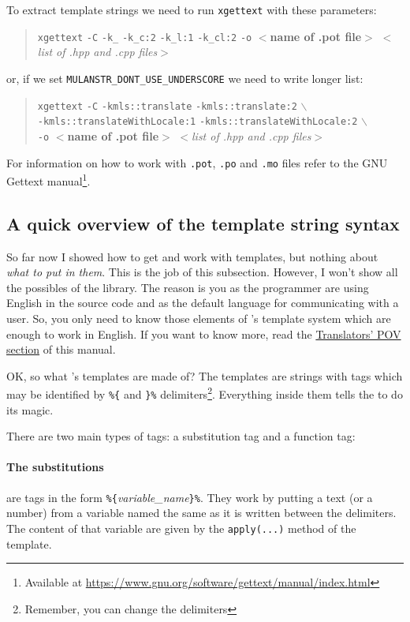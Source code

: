 To extract template strings we need to run \texttt{xgettext} with these parameters: 
\begin{quote}
	\texttt{xgettext} \verb+-C+ \verb+-k_+ \verb+-k_c:2+ \verb+-k_l:1+ \verb+-k_cl:2+ \texttt{-o} $<$\textbf{name of .pot file}$>$ $<$\textit{list of .hpp and .cpp files}$>$
\end{quote}
or, if we set \verb+MULANSTR_DONT_USE_UNDERSCORE+ we need to write longer list:
\begin{quote}
	\texttt{xgettext} \verb+-C+ \verb+-kmls::translate+ \verb+-kmls::translate:2+ $\backslash$ \\ \verb+-kmls::translateWithLocale:1+ \verb+-kmls::translateWithLocale:2+ $\backslash$ \\ \texttt{-o} $<$\textbf{name of .pot file}$>$ $<$\textit{list of .hpp and .cpp files}$>$
\end{quote}

For information on how to work with \texttt{.pot}, \texttt{.po} and \texttt{.mo} files refer to the GNU Gettext manual\footnote{Available at \url{https://www.gnu.org/software/gettext/manual/index.html}}.

\subsection{A quick overview of the template string syntax}
So far now I showed how to get and work with templates, but nothing about \emph{what to put in them}. 
This is the job of this subsection. However, I won't show all the possibles of the \mulan{} library.
The reason is you as the programmer are using English in the source code and as the default language for communicating with a user. 
So, you only need to know those elements of \mulan{}'s template system which are enough to work in English. 
If you want to know more, read the \hyperref[transPOV]{Translators' POV section} of this manual. 

OK, so what \mulan{}'s templates are made of? 
The templates are strings with tags which may be identified by \verb+%{+ and \verb+}%+ delimiters\footnote{Remember, you can change the delimiters}.
Everything inside them tells the \mulan{} to do its magic. 

There are two main types of tags: a substitution tag and a function tag:
\paragraph{The substitutions} are tags in the form \verb+%{+\textit{variable\_name}\verb+}%+. They work by putting a text (or a number) from a variable named the same as it is written between the delimiters.
The content of that variable are given by the \verb+apply(...)+ method of the template. 

